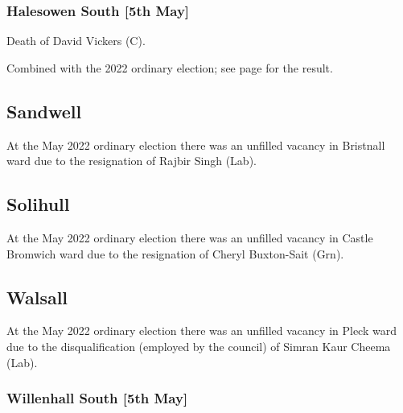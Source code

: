 \documentclass[a4paper,openany]{book}
\begin{document}
\begin{resultsiii}
\subsubsection*{Halesowen South \hspace*{\fill}\nolinebreak[1]%
	\enspace\hspace*{\fill}
	[5th May]}


Death of David Vickers (C).

Combined with the 2022 ordinary election; see page \pageref{DudleyHalesowenSouth} for the result.

\subsection*{Sandwell}

At the May 2022 ordinary election there was an unfilled vacancy in Bristnall ward due to the resignation of Rajbir Singh (Lab).%

\subsection*{Solihull}

At the May 2022 ordinary election there was an unfilled vacancy in Castle Bromwich ward due to the resignation of Cheryl Buxton-Sait (Grn).%

\subsection*{Walsall}

At the May 2022 ordinary election there was an unfilled vacancy in Pleck ward due to the disqualification (employed by the council) of Simran Kaur Cheema (Lab).%

\subsubsection*{Willenhall South \hspace*{\fill}\nolinebreak[1]%
	\enspace\hspace*{\fill}
	[5th May]}



\end{resultsiii}
\end{document}
